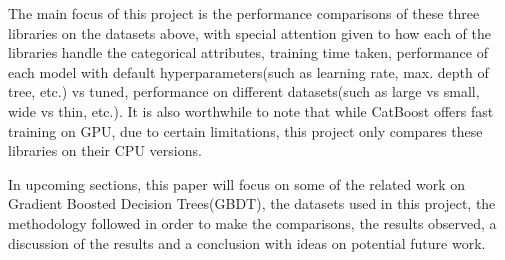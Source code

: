 The main focus of this project is the performance comparisons of these three libraries on the datasets above, with special attention given to how each of the libraries handle the categorical attributes, training time taken, performance of each model with default hyperparameters(such as learning rate, max. depth of tree, etc.) vs tuned, performance on different datasets(such as large vs small, wide vs thin, etc.). It is also worthwhile to note that while CatBoost offers fast training on GPU, due to certain limitations, this project only compares these libraries on their CPU versions.

In upcoming sections, this paper will focus on some of the related work on Gradient Boosted Decision Trees(GBDT), the datasets used in this project, the methodology followed in order to make the comparisons, the results observed, a discussion of the results and a conclusion with ideas on potential future work.